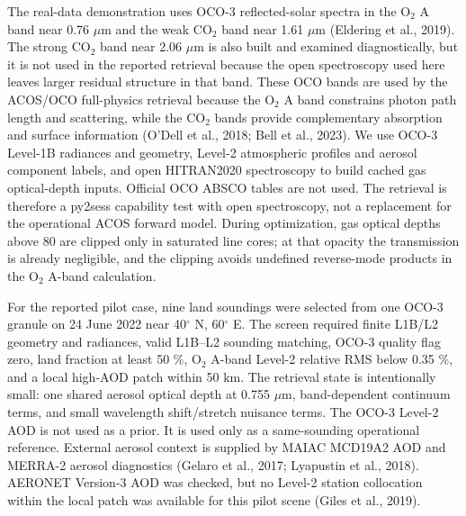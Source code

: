 \documentclass[gmd, manuscript]{copernicus}
\begin{document}
The real-data demonstration uses OCO-3 reflected-solar spectra in the O$_2$ A band
near 0.76 $\mu$m and the weak CO$_2$ band near 1.61 $\mu$m (Eldering et al., 2019).
The strong CO$_2$ band near 2.06 $\mu$m is also built and examined diagnostically, but
it is not used in the reported retrieval because the open spectroscopy used here leaves
larger residual structure in that band.  These OCO bands are used by the ACOS/OCO
full-physics retrieval because the O$_2$ A band constrains photon path length and
scattering, while the CO$_2$ bands provide complementary absorption and surface
information (O'Dell et al., 2018; Bell et al., 2023).  We use OCO-3 Level-1B
radiances and geometry, Level-2 atmospheric profiles and aerosol component labels, and
open HITRAN2020 spectroscopy to build cached gas optical-depth inputs.  Official OCO
ABSCO tables are not used.  The retrieval is therefore a py2sess capability test with
open spectroscopy, not a replacement for the operational ACOS forward model.  During
optimization, gas optical depths above 80 are clipped only in saturated line cores; at
that opacity the transmission is already negligible, and the clipping avoids
undefined reverse-mode products in the O$_2$ A-band calculation.

For the reported pilot case, nine land soundings were selected from one OCO-3 granule
on 24 June 2022 near 40$^\circ$ N, 60$^\circ$ E.  The screen required finite L1B/L2
geometry and radiances, valid L1B--L2 sounding matching, OCO-3 quality flag zero,
land fraction at least 50 \%, O$_2$ A-band Level-2 relative RMS below 0.35 \%, and a
local high-AOD patch within 50 km.  The retrieval state is intentionally small: one
shared aerosol optical depth at 0.755 $\mu$m, band-dependent continuum terms, and
small wavelength shift/stretch nuisance terms.
The OCO-3 Level-2 AOD is not used as a prior.  It is used only as a same-sounding
operational reference.  External aerosol context is supplied by MAIAC MCD19A2 AOD and
MERRA-2 aerosol diagnostics (Gelaro et al., 2017; Lyapustin et al., 2018).  AERONET
Version-3 AOD was checked, but no Level-2 station collocation within the local patch
was available for this pilot scene (Giles et al., 2019).
\end{document}
